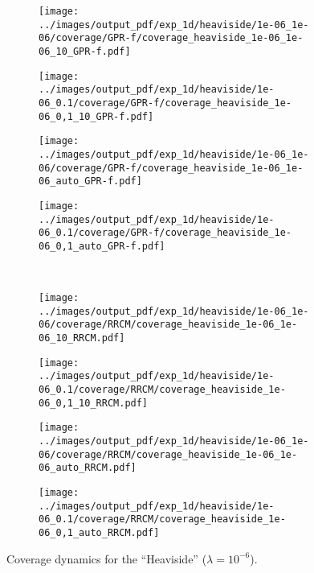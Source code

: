 \documentclass[conference]{IEEEtran}
\begin{document}
\begin{figure}%
  \centering
  \begin{subfigure}[b]{0.25\linewidth}
    \texttt{[image: ../images/output\_pdf/exp\_1d/heaviside/1e-06\_1e-06/coverage/GPR-f/coverage\_heaviside\_1e-06\_1e-06\_10\_GPR-f.pdf]}
  \end{subfigure}%
  \begin{subfigure}[b]{0.25\linewidth}
    \texttt{[image: ../images/output\_pdf/exp\_1d/heaviside/1e-06\_0.1/coverage/GPR-f/coverage\_heaviside\_1e-06\_0,1\_10\_GPR-f.pdf]}
  \end{subfigure}%
  \begin{subfigure}[b]{0.25\linewidth}
    \texttt{[image: ../images/output\_pdf/exp\_1d/heaviside/1e-06\_1e-06/coverage/GPR-f/coverage\_heaviside\_1e-06\_1e-06\_auto\_GPR-f.pdf]}
  \end{subfigure}%
  \begin{subfigure}[b]{0.25\linewidth}
    \texttt{[image: ../images/output\_pdf/exp\_1d/heaviside/1e-06\_0.1/coverage/GPR-f/coverage\_heaviside\_1e-06\_0,1\_auto\_GPR-f.pdf]}
  \end{subfigure}\\
  \begin{subfigure}[b]{0.25\linewidth}
    \texttt{[image: ../images/output\_pdf/exp\_1d/heaviside/1e-06\_1e-06/coverage/RRCM/coverage\_heaviside\_1e-06\_1e-06\_10\_RRCM.pdf]}
  \end{subfigure}%
  \begin{subfigure}[b]{0.25\linewidth}
    \texttt{[image: ../images/output\_pdf/exp\_1d/heaviside/1e-06\_0.1/coverage/RRCM/coverage\_heaviside\_1e-06\_0,1\_10\_RRCM.pdf]}
  \end{subfigure}%
  \begin{subfigure}[b]{0.25\linewidth}
    \texttt{[image: ../images/output\_pdf/exp\_1d/heaviside/1e-06\_1e-06/coverage/RRCM/coverage\_heaviside\_1e-06\_1e-06\_auto\_RRCM.pdf]}
  \end{subfigure}%
  \begin{subfigure}[b]{0.25\linewidth}
    \texttt{[image: ../images/output\_pdf/exp\_1d/heaviside/1e-06\_0.1/coverage/RRCM/coverage\_heaviside\_1e-06\_0,1\_auto\_RRCM.pdf]}
  \end{subfigure}
  \caption{Coverage dynamics for the ``Heaviside'' ($\lambda=10^{-6}$).}
  \label{fig:heaviside_1d_low_noise}
\end{figure}
\end{document}
